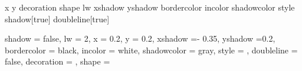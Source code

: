 \makeatletter
{} {x}{}
 {y}{}
 {decoration}{}
 {shape}{}
 {lw}{}
 {xshadow}{}
 {yshadow}{}
 {bordercolor}{}
 {incolor}{}
 {shadowcolor}{}
 {style}{}
 {shadow}[true]{}
 {doubleline}[true]{}

 {	shadow = false,
								lw = 2,
								x = 0.2,
								y = 0.2,
								xshadow =- 0.35,
								yshadow =0.2,
								bordercolor = black,
								incolor = white,
								shadowcolor = gray,
								style = ,
								doubleline = false,
								decoration = , 
								shape = }{}

\newcommand*{\cadre}[1][]{\pasCadre[#1]}

\def\pasCadre[#1]{
	\setkeys[PAS]{cadre}{#1}
	
	\AddToShipoutPicture
	{
		\put(\LenToUnit{\cmdPAS@cadre@x cm},\LenToUnit{\cmdPAS@cadre@y cm})
		{
				\ifPAS@cadre@doubleline
					\edef\dl{double}
				\else
					\edef\dl{}
				\fi
				\begin{tikzpicture}[decoration={\cmdPAS@cadre@decoration,shape=\cmdPAS@cadre@shape}]
					\pgfsetlinewidth{\cmdPAS@cadre@lw pt}
					\ifPAS@cadre@shadow
						\filldraw[
						decorate,
						fill=\cmdPAS@cadre@incolor,
						draw=\cmdPAS@cadre@bordercolor,
						style=\cmdPAS@cadre@style,
						drop shadow={fill=\cmdPAS@cadre@shadowcolor,shadow xshift=\cmdPAS@cadre@xshadow cm,shadow yshift=-\cmdPAS@cadre@yshadow cm},
						\dl] (0,0) -- (0,\paperheight-2*\cmdPAS@cadre@y cm) -- (\paperwidth-2*\cmdPAS@cadre@x cm,\paperheight-2*\cmdPAS@cadre@y cm) -- (\paperwidth-2*\cmdPAS@cadre@x cm,0) -- cycle;
					\else
						\filldraw[
						decorate,
						fill=\cmdPAS@cadre@incolor,
						draw=\cmdPAS@cadre@bordercolor,
						style=\cmdPAS@cadre@style,
						\dl] (0,0) -- (0,\paperheight-2*\cmdPAS@cadre@y cm) -- (\paperwidth-2*\cmdPAS@cadre@x cm,\paperheight-2*\cmdPAS@cadre@y cm) -- (\paperwidth-2*\cmdPAS@cadre@x cm,0) -- cycle;
					\fi
				\end{tikzpicture}
		}
	}
}

